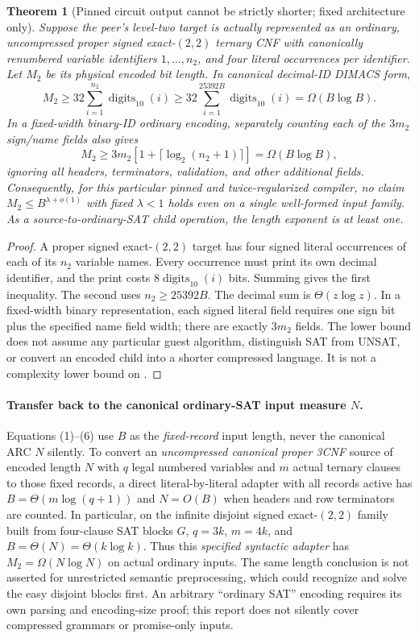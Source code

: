 \documentclass[11pt]{article}
\newtheorem{theorem}{Theorem}
\newcommand{\SAT}{\mathsf{SAT}}
\begin{document}
\begin{theorem}[Pinned circuit output cannot be strictly shorter; fixed architecture only]
Suppose the peer's level-two target is \emph{actually represented as an ordinary, uncompressed proper signed exact-$(2,2)$ ternary CNF} with canonically renumbered variable identifiers $1,\dots,n_2$, and four literal occurrences per identifier. Let $M_2$ be its physical encoded \emph{bit length}. In canonical decimal-ID DIMACS form,
\[
\boxed{M_2\ge 32\sum_{i=1}^{n_2}\operatorname{digits}_{10}(i)
\ge32\sum_{i=1}^{25392B}\operatorname{digits}_{10}(i)
=\Omega(B\log B).}\tag{5}
\]
In a fixed-width binary-ID ordinary encoding, separately counting each of the $3m_2$ sign/name fields also gives
\[
 M_2\ge3m_2[1+\lceil\log_2(n_2+1)\rceil]
=\Omega(B\log B),\tag{6}
\]
ignoring all headers, terminators, validation, and other additional fields. Consequently, for this particular pinned and twice-regularized compiler, no claim $M_2\le B^{\lambda+o(1)}$ with \emph{fixed} $\lambda<1$ holds even on a single well-formed input family. As a source-to-ordinary-SAT child operation, the length exponent is at least one.
\end{theorem}
\begin{proof}
A proper signed exact-$(2,2)$ target has four signed literal occurrences of each of its $n_2$ variable names. Every occurrence must print its own decimal identifier, and the print costs $8\operatorname{digits}_{10}(i)$ bits. Summing gives the first inequality. The second uses $n_2\ge25392B$. The decimal sum is $\Theta(z\log z)$. In a fixed-width binary representation, each signed literal field requires one sign bit plus the specified name field width; there are exactly $3m_2$ fields. The lower bound does not assume any particular guest algorithm, distinguish SAT from UNSAT, or convert an encoded child into a shorter compressed language. It is not a complexity lower bound on \SAT.
\end{proof}

\paragraph{Transfer back to the canonical ordinary-SAT input measure $N$.}
Equations (1)--(6) use $B$ as the \emph{fixed-record} input length, never the canonical ARC $N$ silently. To convert an \emph{uncompressed canonical proper 3CNF} source of encoded length $N$ with $q$ legal numbered variables and $m$ actual ternary clauses to those fixed records, a direct literal-by-literal adapter with all records active has $B=\Theta(m\log(q+1))$ and $N=O(B)$ when headers and row terminators are counted. In particular, on the infinite disjoint signed exact-$(2,2)$ family built from four-clause SAT blocks $G$, $q=3k$, $m=4k$, and $B=\Theta(N)=\Theta(k\log k)$. Thus this \emph{specified syntactic adapter} has $M_2=\Omega(N\log N)$ on actual ordinary inputs. The same length conclusion is not asserted for unrestricted semantic preprocessing, which could recognize and solve the easy disjoint blocks first. An arbitrary ``ordinary SAT'' encoding requires its own parsing and encoding-size proof; this report does not silently cover compressed grammars or promise-only inputs.
\end{document}
